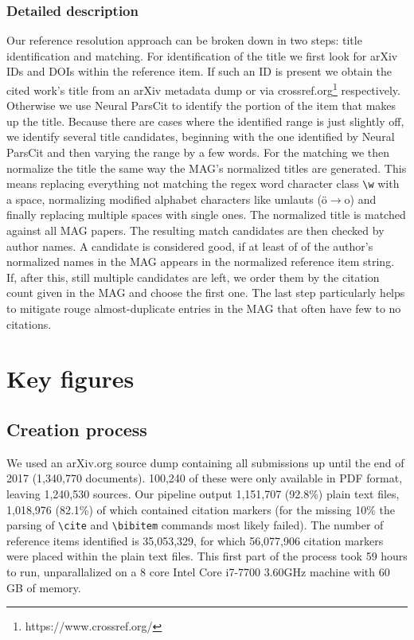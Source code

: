 \subsubsection{Detailed description}
Our reference resolution approach can be broken down in two steps: title identification and matching. For identification of the title we first look for arXiv IDs and DOIs within the reference item. If such an ID is present we obtain the cited work's title from an arXiv metadata dump or via crossref.org\footnote{https://www.crossref.org/} respectively. Otherwise we use Neural ParsCit\cite{Animesh2018} to identify the portion of the item that makes up the title. Because there are cases where the identified range is just slightly off, we identify several title candidates, beginning with the one identified by Neural ParsCit and then varying the range by a few words. For the matching we then normalize the title the same way the MAG's normalized titles are generated. This means replacing everything not matching the regex word character class \texttt{\textbackslash w} with a space, normalizing modified alphabet characters like umlauts (ö$\rightarrow$o) and finally replacing multiple spaces with single ones. The normalized title is matched against all MAG papers. The resulting match candidates are then checked by author names. A candidate is considered good, if at least of of the author's normalized names in the MAG appears in the normalized reference item string. If, after this, still multiple candidates are left, we order them by the citation count given in the MAG and choose the first one. The last step particularly helps to mitigate rouge almost-duplicate entries in the MAG that often have few to no citations.

\section{Key figures}
\subsection{Creation process}
We used an arXiv.org source dump containing all submissions up until the end of 2017 (1,340,770 documents). 100,240 of these were only available in PDF format, leaving 1,240,530 sources. Our pipeline output 1,151,707 (92.8\%) plain text files, 1,018,976 (82.1\%) of which contained citation markers (for the missing 10\% the parsing of \texttt{\textbackslash cite} and \texttt{\textbackslash bibitem} commands most likely failed). The number of reference items identified is 35,053,329, for which 56,077,906 citation markers were placed within the plain text files. This first part of the process took 59 hours to run, unparallalized on a 8 core Intel Core i7-7700 3.60GHz machine with 60 GB of memory.


